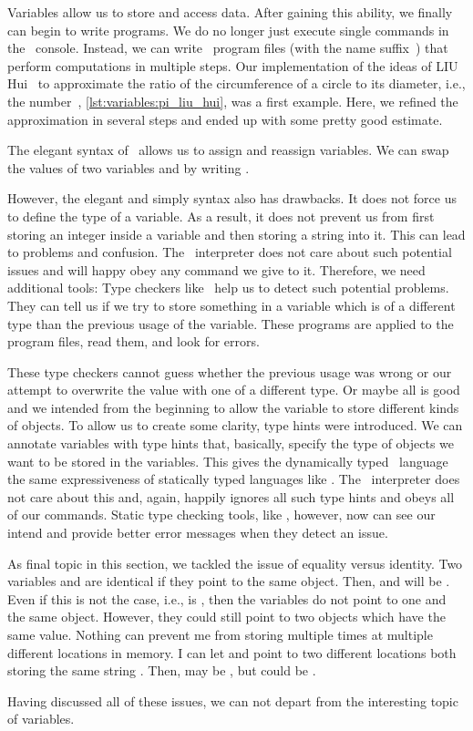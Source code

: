 %
%
Variables allow us to store and access data.
After gaining this ability, we finally can begin to write  programs.
We do no longer just execute single commands in the \python\ console.
Instead, we can write \python\ program files (with the name suffix~) that perform computations in multiple steps.
Our implementation of the ideas of LIU Hui~ to approximate the ratio of the circumference of a circle to its diameter, i.e., the number~\numberPi, \cref{lst:variables:pi_liu_hui}, was a first example.
Here, we refined the approximation in several steps and ended up with some pretty good estimate.

The elegant syntax of \python\ allows us to assign and reassign variables.
We can swap the values of two variables  and  by writing .

However, the elegant and simply syntax also has drawbacks.
It does not force us to define the type of a variable.
As a result, it does not prevent us from first storing an integer inside a variable and then storing a string into it.
This can lead to problems and confusion.
The \python\ interpreter does not care about such potential issues and will happy obey any command we give to it.
Therefore, we need additional tools:
Type checkers like \mypy\ help us to detect such potential problems.
They can tell us if we try to store something in a variable which is of a different type than the previous usage of the variable.
These programs are applied to the program files, read them, and look for errors.

These type checkers cannot guess whether the previous usage was wrong or our attempt to overwrite the value with one of a different type.
Or maybe all is good and we intended from the beginning to allow the variable to store different kinds of objects.
To allow us to create some clarity, type hints were introduced.
We can annotate variables with type hints that, basically, specify the type of objects we want to be stored in the variables.
This gives the dynamically typed \python\ language the same expressiveness of statically typed languages like .
The \python\ interpreter does not care about this and, again, happily ignores all such type hints and obeys all of our commands.
Static type checking tools, like \mypy, however, now can see our intend and provide better error messages when they detect an issue.

As final topic in this section, we tackled the issue of equality versus identity.
Two variables  and  are identical if they point to the same object.
Then,  and  will be .
Even if this is not the case, i.e.,  is , then the variables do not point to one and the same object.
However, they could still point to two objects which have the same value.
Nothing can prevent me from storing  multiple times at multiple different locations in memory.
I can let  and  point to two different locations both storing the same string .
Then,  may be , but  could be .

Having discussed all of these issues, we can not depart from the interesting topic of variables.%
%
\endhsection%
%
